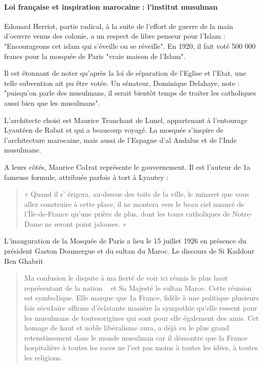 \paragraph{Loi française et inspiration marocaine : l'institut musulman}
Edouard Herriot, partie radical, à la suite de l'effort de guerre de la main d'oeuvre venus des colonie, a un respect de libre penseur pour l'Islam : "Encourageons cet islam qui s'éveille ou se réveille". En 1920, il fait voté 500 000 francs pour la mosquée de Paris "vraie maison de l'Islam".

Il est étonnant de noter qu'après la loi de séparation de l'Eglise et l'Etat, une telle subvention ait pu être votée. Un sénateur, Dominique Delahaye, note : "puisqu'on parle des musulmans, il serait bientôt temps de traiter les catholiques aussi bien que les musulmans".

L'architecte choisi est Maurice Tranchant de Lunel, appartenant à l'entourage Lyautéen de Rabat et qui a beaucoup voyagé. La mosquée s'inspire de l'architecture marocaine, mais aussi de l'Espagne d'al Andalus et de l'Inde musulmane. 

A leurs côtés,
Maurice Co1rat représente le gouvernement. Il est l'auteur de
1a fameuse formule, attribuée parfois à tort à Lyautey :
\begin{quote}
    « Quand
il s' érigera, au-dessus des toits de la ville, le minaret que vous
allez construire à cette place, il ne montera vers le beau ciel
nuancé de l'Île-de-France qu'une prière de plus, dont les tours
catholiques de Notre-Dame ne seront point jalouses. »
\end{quote}

L'inauguration de la Mosquée de Paris a lieu le 15 juillet 1926 en présence du président Gaston Doumergue et du sultan du Maroc. Le discours de Si Kaddour Ben Ghabrit 
\begin{quote}
    
Ma confusion le dispute à
ma fierté de voir ici réunis le plus haut représentant de la nation
~ et Sa Majesté le sultan Maroc. Cette réunion est symbo1ique. Elle marque que 1a France, fidèle à une politique plusieurs
fois sécu1aire affirme d'éclatante manière la sympathie qu'elle ressent pour les musulmans de toutesorigines qui sont pour elle également des amis. Cet homage de haut et noble libéralisme aura, a déjà eu le plus grand retenstissement dans le monde musulman car il démontre que la France hospitalière à toutes les races ne l'est pas moins à toutes les idées, à toutes les religions. \end{quote}

